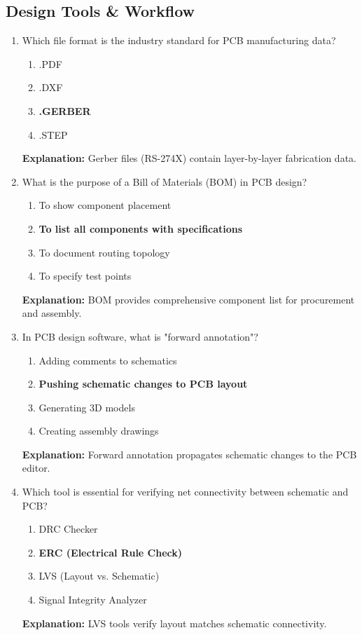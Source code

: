 \documentclass{article}
\begin{document}
	\subsection*{Design Tools \& Workflow}
	
	\begin{enumerate}[resume]
		\item Which file format is the industry standard for PCB manufacturing data?
		\begin{enumerate}
			\item .PDF
			\item .DXF
			\item \textbf{.GERBER}
			\item .STEP
		\end{enumerate}
		\textbf{Explanation:} Gerber files (RS-274X) contain layer-by-layer fabrication data.
		
		\item What is the purpose of a Bill of Materials (BOM) in PCB design?
		\begin{enumerate}
			\item To show component placement
			\item \textbf{To list all components with specifications}
			\item To document routing topology
			\item To specify test points
		\end{enumerate}
		\textbf{Explanation:} BOM provides comprehensive component list for procurement and assembly.
		
		\item In PCB design software, what is "forward annotation"?
		\begin{enumerate}
			\item Adding comments to schematics
			\item \textbf{Pushing schematic changes to PCB layout}
			\item Generating 3D models
			\item Creating assembly drawings
		\end{enumerate}
		\textbf{Explanation:} Forward annotation propagates schematic changes to the PCB editor.
		
		\item Which tool is essential for verifying net connectivity between schematic and PCB?
		\begin{enumerate}
			\item DRC Checker
			\item \textbf{ERC (Electrical Rule Check)}
			\item LVS (Layout vs. Schematic)
			\item Signal Integrity Analyzer
		\end{enumerate}
		\textbf{Explanation:} LVS tools verify layout matches schematic connectivity.
		

\end{enumerate}
\end{document}
